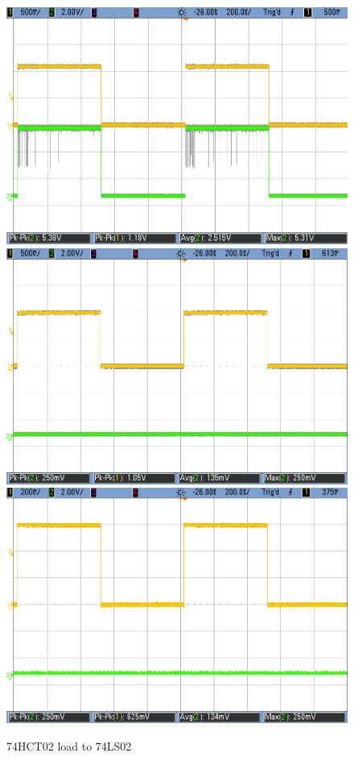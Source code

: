 \begin{figure}[h!]
	   \includegraphics[scale=0.19]{LS-HCT-1p1V.png}\\
	   \vspace{0.2cm}
        \includegraphics[scale=0.19]{HCT-LS-1V.png}\hspace{1cm}
        \includegraphics[scale=0.19]{HCT-LS-0p6V.png}
        \caption{\color{cyan}74HCT02 load to 74LS02}
        \label{fig:ej2exhcttols}
    \end{figure}


